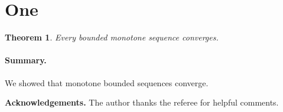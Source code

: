 \documentclass{article}
\newtheorem{theorem}{Theorem}
\begin{document}
\section{One}

\begin{theorem}
Every bounded monotone sequence converges.
\end{theorem}

\paragraph{Summary.} We showed that monotone bounded sequences converge.

{\bf Acknowledgements.} The author thanks the referee for helpful comments.
\end{document}
